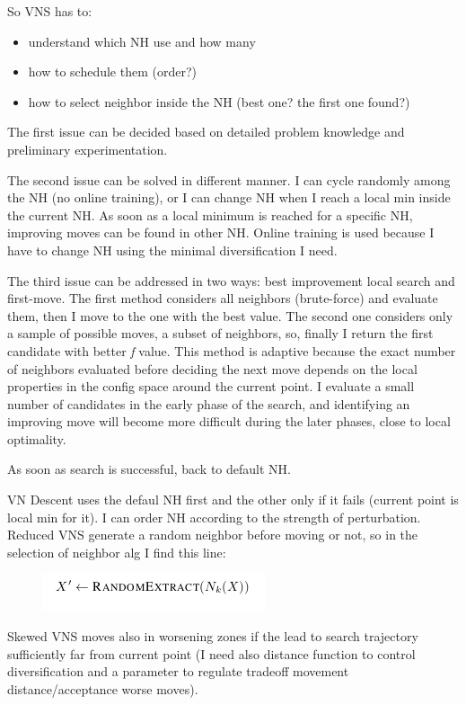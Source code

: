 \documentclass[11pt]{article}
\begin{document}
So VNS has to:

\begin{itemize}
\item understand which NH use and how many
\item how to schedule them (order?)
\item how to select neighbor inside the NH (best one? the first one found?)
\end{itemize}

The first issue can be decided based on detailed problem knowledge and preliminary experimentation.

The second issue can be solved in different manner. I can cycle randomly among the NH (no online training), or I can change NH when I reach a local min inside the current NH. 
As soon as a local minimum is reached for a specific NH, improving moves can be found in other NH. Online training is used because I have to change NH using the minimal diversification I need.

The third issue can be addressed in two ways: best improvement local search and first-move. The first method considers all neighbors (brute-force) and evaluate them, then I move to the one with the best value. The second one considers only a sample of possible moves, a subset of neighbors, so, finally I return the first candidate with better \textit{f} value. This method is adaptive because the exact number of neighbors evaluated before deciding the next move depends on the local properties in the config space around the current point.
I evaluate a small number of candidates in the early phase of the search, and identifying
an improving move will become more difficult during the later phases, close to local optimality.

As soon as search is successful, back to default NH.

VN Descent uses the defaul NH first and the other only if it fails (current point is local min for it). I can order NH according to the strength of perturbation.
Reduced VNS generate a random neighbor before moving or not, so in the selection of neighbor alg I find this line:

\begin{figure}[H]
\includegraphics[scale=0.60]{random}
\centering
\end{figure}

Skewed VNS moves also in worsening zones if the lead to search trajectory sufficiently far from current point (I need also distance function to control diversification and a parameter to regulate tradeoff movement distance/acceptance worse moves).
\end{document}
